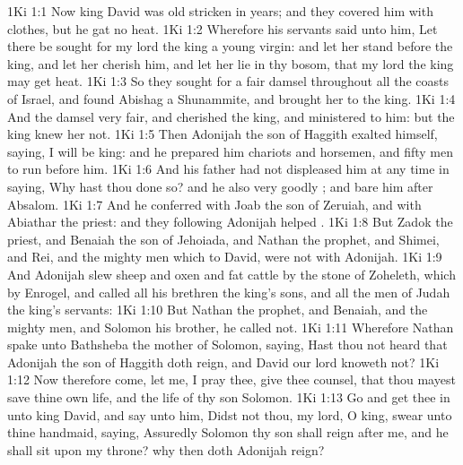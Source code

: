 \vs 1Ki 1:1 Now king David was old  stricken in years; and they covered him with clothes, but he gat no heat.
\vs 1Ki 1:2 Wherefore his servants said unto him, Let there be sought for my lord the king a young virgin: and let her stand before the king, and let her cherish him, and let her lie in thy bosom, that my lord the king may get heat.
\vs 1Ki 1:3 So they sought for a fair damsel throughout all the coasts of Israel, and found Abishag a Shunammite, and brought her to the king.
\vs 1Ki 1:4 And the damsel  very fair, and cherished the king, and ministered to him: but the king knew her not.
\vs 1Ki 1:5 Then Adonijah the son of Haggith exalted himself, saying, I will be king: and he prepared him chariots and horsemen, and fifty men to run before him.
\vs 1Ki 1:6 And his father had not displeased him at any time in saying, Why hast thou done so? and he also  very goodly ; and  bare him after Absalom.
\vs 1Ki 1:7 And he conferred with Joab the son of Zeruiah, and with Abiathar the priest: and they following Adonijah helped .
\vs 1Ki 1:8 But Zadok the priest, and Benaiah the son of Jehoiada, and Nathan the prophet, and Shimei, and Rei, and the mighty men which  to David, were not with Adonijah.
\vs 1Ki 1:9 And Adonijah slew sheep and oxen and fat cattle by the stone of Zoheleth, which  by Enrogel, and called all his brethren the king's sons, and all the men of Judah the king's servants:
\vs 1Ki 1:10 But Nathan the prophet, and Benaiah, and the mighty men, and Solomon his brother, he called not.
\vs 1Ki 1:11 Wherefore Nathan spake unto Bathsheba the mother of Solomon, saying, Hast thou not heard that Adonijah the son of Haggith doth reign, and David our lord knoweth  not?
\vs 1Ki 1:12 Now therefore come, let me, I pray thee, give thee counsel, that thou mayest save thine own life, and the life of thy son Solomon.
\vs 1Ki 1:13 Go and get thee in unto king David, and say unto him, Didst not thou, my lord, O king, swear unto thine handmaid, saying, Assuredly Solomon thy son shall reign after me, and he shall sit upon my throne? why then doth Adonijah reign?
